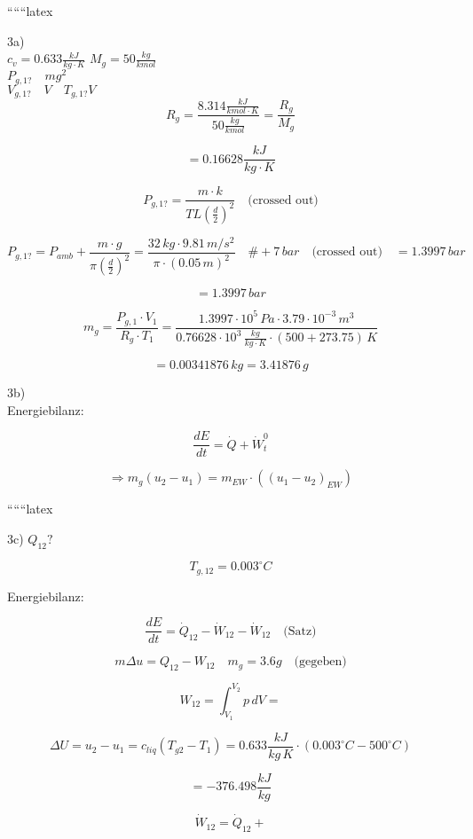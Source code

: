 
``````latex


3a) \\
$c_v = 0.633 \frac{kJ}{kg \cdot K}$ \hspace{1cm} $M_g = 50 \frac{kg}{kmol}$ \\

$P_{g,1?} \quad mg^2$ \\

$V_{g,1?} \quad V \quad T_{g,1?} V$ \\

\[
R_g = \frac{8.314 \frac{kJ}{kmol \cdot K}}{50 \frac{kg}{kmol}} = \frac{R_g}{M_g}
\]

\[
= 0.16628 \frac{kJ}{kg \cdot K}
\]

\[
P_{g,1?} = \frac{m \cdot k}{T L \left( \frac{d}{2} \right)^2} \quad \text{(crossed out)}
\]

\[
P_{g,1?} = P_{amb} + \frac{m \cdot g}{\pi \left( \frac{d}{2} \right)^2} = \frac{32 \, kg \cdot 9.81 \, m/s^2}{\pi \cdot (0.05 \, m)^2} \quad \# + 7 \, bar \quad \text{(crossed out)} \quad = 1.3997 \, bar
\]

\[
= 1.3997 \, bar
\]

\[
m_g = \frac{P_{g,1} \cdot V_1}{R_g \cdot T_1} = \frac{1.3997 \cdot 10^5 \, Pa \cdot 3.79 \cdot 10^{-3} \, m^3}{0.76628 \cdot 10^3 \, \frac{kg}{kg \cdot K} \cdot (500 + 273.75) \, K}
\]

\[
= 0.00341876 \, kg = 3.41876 \, g
\]

3b) \\
Energiebilanz:

\[
\frac{dE}{dt} = \dot{Q} + \dot{W}_t^0
\]

\[
\Rightarrow m_g (u_2 - u_1) = m_{EW} \cdot \left( (u_1 - u_2)_{EW} \right)
\]

``````latex

3c) \(Q_{12}?\)

\[T_{g,12} = 0.003^\circ C\]

Energiebilanz:

\[
\frac{dE}{dt} = \dot{Q}_{12} - \dot{W}_{12} - \dot{W}_{12} \quad \text{(Satz)}
\]

\[
m \Delta u = Q_{12} - W_{12} \quad m_g = 3.6g \quad \text{(gegeben)}
\]

\[
W_{12} = \int_{V_1}^{V_2} p \, dV = 
\]

\[
\Delta U = u_2 - u_1 = c_{liq} (T_{g2} - T_1) = 0.633 \frac{kJ}{kg \, K} \cdot (0.003^\circ C - 500^\circ C)
\]

\[
= -376.498 \frac{kJ}{kg}
\]

\[
\dot{W}_{12} = \dot{Q}_{12} + 
\]

